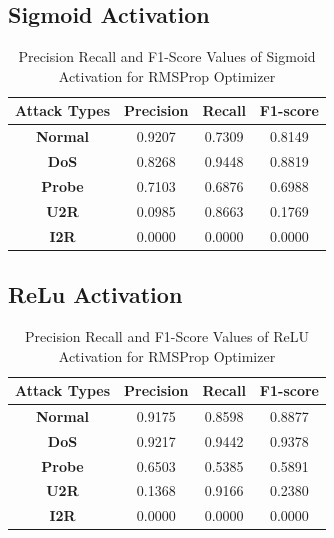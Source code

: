 \documentclass[12pt, a4paper]{report}
\begin{document}
\begin{appendices}
   \subsection{Sigmoid Activation}
   \begin{table}[h]
	\centering
	\captionsetup{justification=centering,margin=2cm}
	\begin{tabular}{|c|c|c|c|}
	\hline
	\textbf{Attack Types} & \textbf{Precision} & \textbf{Recall} & \textbf{F1-score} \\ \hline
	\textbf{Normal}       & 0.9207             & 0.7309          & 0.8149            \\ \hline
	\textbf{DoS}          & 0.8268             & 0.9448          & 0.8819            \\ \hline
	\textbf{Probe}        & 0.7103             & 0.6876          & 0.6988            \\ \hline
	\textbf{U2R}          & 0.0985             & 0.8663          & 0.1769            \\ \hline
	\textbf{I2R}          & 0.0000             & 0.0000          & 0.0000            \\ \hline
	\end{tabular}
	\caption{Precision Recall and F1-Score Values of Sigmoid Activation for RMSProp Optimizer}
	\label{classification sigmoid rms tflearn}
	\end{table} 
	
	\subsection{ReLu Activation}
   	\begin{table}[h]
		\centering
		\captionsetup{justification=centering,margin=2cm}
		\begin{tabular}{|c|c|c|c|}
		\hline
		\textbf{Attack Types} & \textbf{Precision} & \textbf{Recall} & \textbf{F1-score} \\ \hline
		\textbf{Normal}       & 0.9175             & 0.8598          & 0.8877            \\ \hline
		\textbf{DoS}          & 0.9217             & 0.9442          & 0.9378            \\ \hline
		\textbf{Probe}        & 0.6503             & 0.5385          & 0.5891            \\ \hline
		\textbf{U2R}          & 0.1368             & 0.9166          & 0.2380            \\ \hline
		\textbf{I2R}          & 0.0000             & 0.0000          & 0.0000            \\ \hline
		\end{tabular}
		\caption{Precision Recall and F1-Score Values of ReLU Activation for RMSProp Optimizer}
		\label{classification relu rms tflearn}
		\end{table} 
	\clearpage

\end{appendices}
\end{document}
